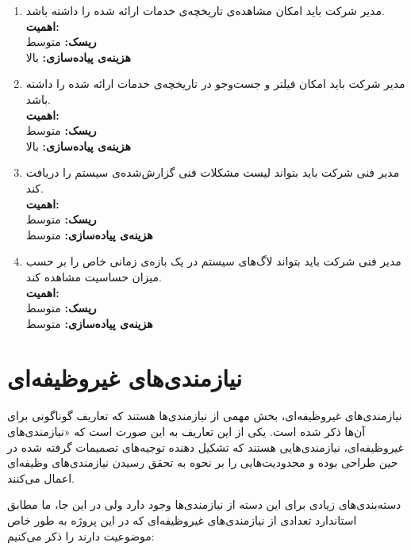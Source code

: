 \begin{enumerate}
\item
مدیر شرکت باید امکان مشاهده‌ی تاریخچه‌ی خدمات ارائه شده را داشته باشد.
\\
\textbf{اهمیت:} 
\\
\textbf{ریسک:} متوسط
\\
\textbf{هزینه‌ی پیاده‌سازی:} بالا


\item
مدیر شرکت باید امکان فیلتر و جست‌وجو در تاریخچه‌ی خدمات ارائه شده را داشته باشد.
\\
\textbf{اهمیت:} 
\\
\textbf{ریسک:} متوسط
\\
\textbf{هزینه‌ی پیاده‌سازی:} بالا

\item
مدیر فنی شرکت باید بتواند لیست مشکلات فنی گزارش‌شده‌ی سیستم را دریافت کند.
\\
\textbf{اهمیت:} 
\\
\textbf{ریسک:} متوسط
\\
\textbf{هزینه‌ی پیاده‌سازی:} متوسط



\item
مدیر فنی شرکت باید بتواند لاگ‌های سیستم در یک بازه‌ی زمانی خاص را بر حسب میزان حساسیت مشاهده کند.
\\
\textbf{اهمیت:} 
\\
\textbf{ریسک:} متوسط
\\
\textbf{هزینه‌ی پیاده‌سازی:} متوسط

\end{enumerate}

\section{نیاز‌مندی‌های غیروظیفه‌ای}

نیازمندی‌های غیروظیفه‌ای، بخش مهمی از نیازمندی‌ها هستند که تعاریف گوناگونی برای آن‌ها ذکر شده است. یکی از این تعاریف به این صورت است که «نیازمندی‌های غیروظیفه‌ای، نیازمندی‌هایی هستند که تشکیل دهنده توجیه‌های تصمیمات گرفته شده در حین طراحی بوده و محدودیت‌هایی را بر نحوه به تحقق رسیدن نیازمندی‌های وظیفه‌ای اعمال می‌کنند.

دسته‌بندی‌های زیادی برای این دسته از نیازمندی‌ها وجود دارد ولی در این جا، ما مطابق استاندارد  تعدادی از نیازمندی‌های غیروظیفه‌ای که در این پروژه به طور خاص موضوعیت دارند را ذکر می‌کنیم:

